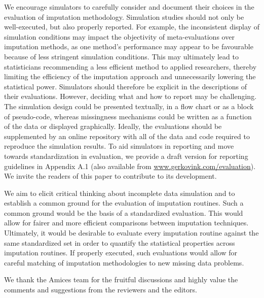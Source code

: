 \documentclass[bimj,fleqn]{w-art}
\begin{document}
We encourage simulators to carefully consider and document their choices in the evaluation of imputation methodology. Simulation studies should not only be well-executed, but also properly reported. For example, the inconsistent display of simulation conditions may impact the objectivity of meta-evaluations over imputation methods, as one method's performance may appear to be favourable because of less stringent simulation conditions. This may ultimately lead to statisticians recommending a less efficient method to applied researchers, thereby limiting the efficiency of the imputation approach and unnecessarily lowering the statistical power. Simulators should therefore be explicit in the descriptions of their evaluations. However, deciding what and how to report may be challenging. The simulation design could be presented textually, in a flow chart or as a block of pseudo-code, whereas missingness mechanisms could be written as a function of the data or displayed graphically. Ideally, the evaluations should be supplemented by an online repository with all of the data and code required to reproduce the simulation results. To aid simulators in reporting and move towards standardization in evaluation, we provide a draft version for reporting guidelines in Appendix A.1 (also available from \underline{www.gerkovink.com/evaluation}). We invite the readers of this paper to contribute to its development. 

We aim to elicit critical thinking about incomplete data simulation and to establish a common ground for the evaluation of imputation routines. Such a common ground would be the basis of a standardized evaluation. This would allow for fairer and more efficient comparisons between imputation techniques. Ultimately, it would be desirable to evaluate every imputation routine against the same standardized set in order to quantify the statistical properties across imputation routines. If properly executed, such evaluations would allow for careful matching of imputation methodologies to new missing data problems. 



\begin{acknowledgement}
We thank the Amices team for the fruitful discussions and highly value the comments and suggestions from the reviewers and the editors. 
\end{acknowledgement}
\vspace*{1pc}

\end{document}
